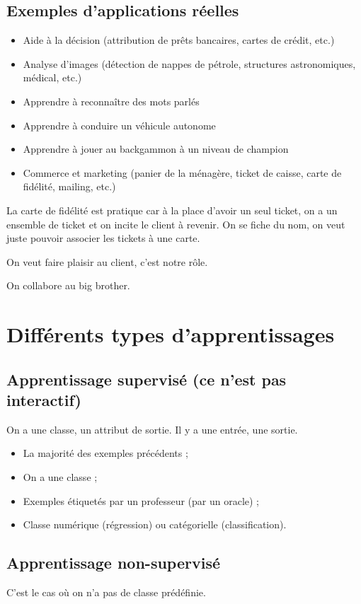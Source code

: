 \subsection{Exemples d'applications réelles}
\begin{itemize}
    \item Aide à la décision (attribution de prêts bancaires, cartes de crédit, etc.)
    \item Analyse d'images (détection de nappes de pétrole, structures astronomiques, médical, etc.)
    \item Apprendre à reconnaître des mots parlés
    \item Apprendre à conduire un véhicule autonome
    \item Apprendre à jouer au backgammon à un niveau de champion
    \item Commerce et marketing (panier de la ménagère, ticket de caisse, carte de fidélité, mailing, etc.)
\end{itemize}

La carte de fidélité est pratique car à la place d'avoir un seul ticket, on a un ensemble de ticket et on incite le client à revenir. On se fiche du nom, on veut juste pouvoir associer les tickets à une carte.

On veut faire plaisir au client, c'est notre rôle.

On collabore au big brother.

\section{Différents types d'apprentissages}

\subsection{Apprentissage supervisé (ce n'est pas interactif)}
On a une classe, un attribut de sortie. Il y a une entrée, une sortie.

\begin{itemize}
    \item La majorité des exemples précédents ;
    \item On a une classe ;
    \item Exemples étiquetés par un professeur (par un oracle) ;
    \item Classe numérique (régression) ou catégorielle (classification).
\end{itemize}

\subsection{Apprentissage non-supervisé}
C'est le cas où on n'a pas de classe prédéfinie.


